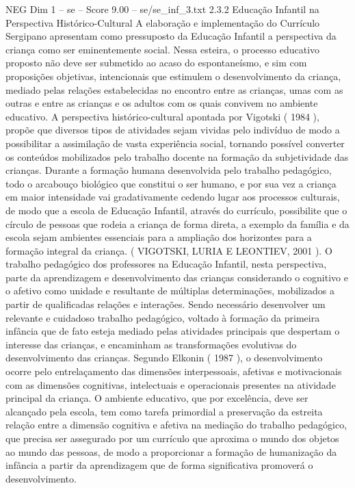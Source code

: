 \begin{textsample}{NEG Dim 1 – se – Score 9.00 – se/se\_inf\_3.txt}  \label{ex:f1_neg_208}
2.3.2 Educação Infantil na Perspectiva Histórico-Cultural A elaboração e implementação do Currículo Sergipano apresentam como pressuposto da Educação Infantil a perspectiva da criança como ser eminentemente social.
Nessa esteira, o processo educativo proposto não deve ser submetido ao acaso do espontaneísmo, e sim com proposições objetivas, intencionais que estimulem o desenvolvimento da criança, mediado pelas relações estabelecidas no encontro entre as crianças, umas com as outras e entre as crianças e os adultos com os quais convivem no ambiente educativo.
A perspectiva histórico-cultural apontada por Vigotski ( 1984 ), propõe que diversos tipos de atividades sejam vividas pelo indivíduo de modo a possibilitar a assimilação de vasta experiência social, tornando possível converter os conteúdos mobilizados pelo trabalho docente na formação da subjetividade das crianças.
Durante a formação humana desenvolvida pelo trabalho pedagógico, todo o arcabouço biológico que constitui o ser humano, e por sua vez a criança em maior intensidade vai gradativamente cedendo lugar aos processos culturais, de modo que a escola de Educação Infantil, através do currículo, possibilite que o círculo de pessoas que rodeia a criança de forma direta, a exemplo da família e da escola sejam ambientes essenciais para a ampliação dos horizontes para a formação integral da criança. ( VIGOTSKI, LURIA E LEONTIEV, 2001 ).
O trabalho pedagógico dos professores na Educação Infantil, nesta perspectiva, parte da aprendizagem e desenvolvimento das crianças considerando o cognitivo e o afetivo como unidade e resultante de múltiplas determinações, mobilizados a partir de qualificadas relações e interações.
Sendo necessário desenvolver um relevante e cuidadoso trabalho pedagógico, voltado à formação da primeira infância que de fato esteja mediado pelas atividades principais que despertam o interesse das crianças, e encaminham as transformações evolutivas do desenvolvimento das crianças.
Segundo Elkonin ( 1987 ), o desenvolvimento ocorre pelo entrelaçamento das dimensões interpessoais, afetivas e motivacionais com as dimensões cognitivas, intelectuais e operacionais presentes na atividade principal da criança.
O ambiente educativo, que por excelência, deve ser alcançado pela escola, tem como tarefa primordial a preservação da estreita relação entre a dimensão cognitiva e afetiva na mediação do trabalho pedagógico, que precisa ser assegurado por um currículo que aproxima o mundo dos objetos ao mundo das pessoas, de modo a proporcionar a formação de humanização da infância a partir da aprendizagem que de forma significativa promoverá o desenvolvimento.

\end{textsample}
